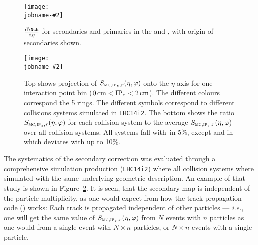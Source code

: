 \documentclass[compat,11pt]{alicenote}
\newcommand*{\etaphi}{\ensuremath(\eta,\varphi)}
\newcommand*\SecMap{\ensuremath S_{\subMC,\subIPz,r}\etaphi}
\newcommand{\figref}[1]{Figure~\ref{#1}}
\newcommand\figinput[2][\textwidth]{%
  \texttt{[image: \\jobname-\#2]}}
\begin{document}
\begin{figure}[]
  \centering
  \figinput[.9\textwidth]{secondary_origin}
  \caption{$\dndeta$ for secondaries and primaries in the \FMD{} and
    \SPD{}, with origin of secondaries shown.}
  \label{secondaries}
\end{figure} 

\begin{figure}[]
  \centering
  \figinput[.8\textwidth]{secmap_pp_aa_one}
  \caption{Top shows projection of $\SecMap$ onto the $\eta$ axis for
    one interaction point bin ($\unit[0]{cm}<\IPz{}<\unit[2]{cm}$).
    The different colours correspond the 5 \FMD{} rings.  The
    different symbols correspond to different collisions systems
    simulated in \texttt{LHC14i2}.  The bottom shows the ratio
    $\SecMap$ for each collision system to the average $\SecMap$ over
    all collision systems. All systems fall with--in 5\%, except
    \PbpCol{} and \PbPbCol{} in  which deviates with up to
    10\%. }
  \label{fig:secmap:all}
\end{figure} 
 
The systematics of the secondary correction was evaluated through a
comprehensive simulation production
(\href{https://alimonitor.cern.ch/job_details.jsp?jt_field1=LHC14i2}{\texttt{LHC14i2}})
where all collision systems where simulated with the same underlying
geometric description. An example of that study is shown in
\figref{fig:secmap:all}.  It is seen, that the secondary map is
independent of the particle multiplicity, as one would expect from how
the track propagation code () works: Each track is propagated
independent of other particles --- \textit{i.e.}, one will get the
same value of $\SecMap$ from $N$ events with $n$ particles as one
would from a single event with $N\times n$ particles, or $N\times n$
events with a single particle.
\end{document}

